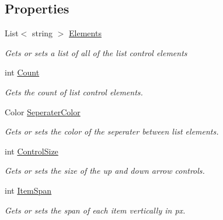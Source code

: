 \subsection*{Properties}
\begin{DoxyCompactItemize}
\item 
List$<$ string $>$ \hyperlink{class_midnight_blue_1_1_engine_1_1_u_i_1_1_list_control_a564e4c395ac839e5110c5c08575d690f}{Elements}
\begin{DoxyCompactList}\small\item\em Gets or sets a list of all of the list control elements \end{DoxyCompactList}\item 
int \hyperlink{class_midnight_blue_1_1_engine_1_1_u_i_1_1_list_control_aac9ef8692391a220f8462df06720f42a}{Count}
\begin{DoxyCompactList}\small\item\em Gets the count of list control elements. \end{DoxyCompactList}\item 
Color \hyperlink{class_midnight_blue_1_1_engine_1_1_u_i_1_1_list_control_a8e7ece86f6bab1d06429001edd6d23e5}{Seperater\+Color}
\begin{DoxyCompactList}\small\item\em Gets or sets the color of the seperater between list elements. \end{DoxyCompactList}\item 
int \hyperlink{class_midnight_blue_1_1_engine_1_1_u_i_1_1_list_control_ab54c707895599c425bf9e9ffd89994d8}{Control\+Size}
\begin{DoxyCompactList}\small\item\em Gets or sets the size of the up and down arrow controls. \end{DoxyCompactList}\item 
int \hyperlink{class_midnight_blue_1_1_engine_1_1_u_i_1_1_list_control_ac649c09e8fb1d6ffb6760f80deecfd8f}{Item\+Span}
\begin{DoxyCompactList}\small\item\em Gets or sets the span of each item vertically in px. \end{DoxyCompactList}\end{DoxyCompactItemize}
